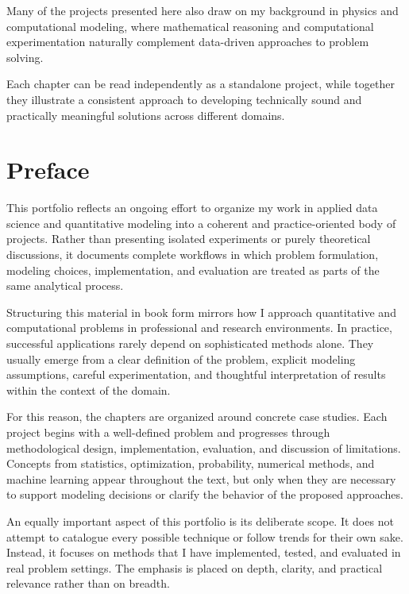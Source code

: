 \documentclass[
  12pt,
  letterpaper,
]{book}
\begin{document}
Many of the projects presented here also draw on my background in
physics and computational modeling, where mathematical reasoning and
computational experimentation naturally complement data-driven
approaches to problem solving.

Each chapter can be read independently as a standalone project, while
together they illustrate a consistent approach to developing technically
sound and practically meaningful solutions across different domains.


\chapter*{Preface}\label{preface}


This portfolio reflects an ongoing effort to organize my work in applied
data science and quantitative modeling into a coherent and
practice-oriented body of projects. Rather than presenting isolated
experiments or purely theoretical discussions, it documents complete
workflows in which problem formulation, modeling choices,
implementation, and evaluation are treated as parts of the same
analytical process.

Structuring this material in book form mirrors how I approach
quantitative and computational problems in professional and research
environments. In practice, successful applications rarely depend on
sophisticated methods alone. They usually emerge from a clear definition
of the problem, explicit modeling assumptions, careful experimentation,
and thoughtful interpretation of results within the context of the
domain.

For this reason, the chapters are organized around concrete case
studies. Each project begins with a well-defined problem and progresses
through methodological design, implementation, evaluation, and
discussion of limitations. Concepts from statistics, optimization,
probability, numerical methods, and machine learning appear throughout
the text, but only when they are necessary to support modeling decisions
or clarify the behavior of the proposed approaches.

An equally important aspect of this portfolio is its deliberate scope.
It does not attempt to catalogue every possible technique or follow
trends for their own sake. Instead, it focuses on methods that I have
implemented, tested, and evaluated in real problem settings. The
emphasis is placed on depth, clarity, and practical relevance rather
than on breadth.
\end{document}
